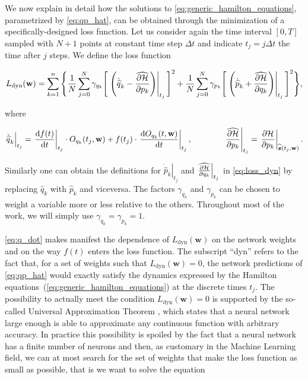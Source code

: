 \documentclass[prd,aps,a4paper,eqsecnum,nofootinbib,floatfix,twocolumn,superscriptaddress]{revtex4-2}
\renewcommand{\quote}[1]{``#1''}
\begin{document}
We now explain in detail how the solutions to \eqref{eq:generic_hamilton_equations}, parametrized by \eqref{eq:qp_hat}, can be obtained through the minimization of a  specifically-designed loss function. Let us consider again the time interval $[0,T]$ sampled with $N+1$ points at constant time step $\Delta t$ and indicate $t_j=j\Delta t$ the time after $j$ steps. We define the loss function
\begin{widetext}

\begin{equation} \label{eq:loss_dyn}
    L_\mathrm{dyn}(\textbf{w}) = \sum_{k=1}^{n} \Bigg\{\dfrac{1}{N} \sum_{j=0}^{N} \gamma_{q_k}\Bigg[\left.\Bigg(\dot{\widehat{q}}_k-\widehat{\pdv{\mathcal{H}}{p_{k}}}\Bigg)\right|_{t_j}\Bigg]^2 +\dfrac{1}{N} \sum_{j=0}^{N}\gamma_{p_k}\Bigg[\left.\Bigg(\dot{\widehat{p}}_k+\widehat{\pdv{\mathcal{H}}{q_k}}\Bigg)\right|_{t_j} \Bigg]^2\Bigg\},
\end{equation}

where

\begin{equation}\label{eq:q_dot}
    \left. \dot{\widehat{q}}_k\right|_{t_j} = \left.\dv{f(t)}{t}\right|_{t_j}\cdot O_{q_k}(t_j,\textbf{w})+f(t_j)\cdot \left.\dv{O_{q_k}(t,\textbf{w})}{t}\right|_{t_j}, \qquad\qquad \left. \widehat{\pdv{\mathcal{H}}{p_k}}\right|_{t_j}=\left.\pdv{\mathcal{H}}{p_k}\right|_{\widehat{\textbf{z}}(t_j,\textbf{w})}.
\end{equation}

\end{widetext}
Similarly one can obtain the definitions for $\left.\dot{\widehat{p}}_k\right|_{t_j}$ and $\left.\widehat{\pdv{\mathcal{H}}{q_k}}\right|_{t_j}$ in \eqref{eq:loss_dyn} by replacing $\widehat{q}_k$ with $\widehat{p}_k$ and viceversa. The factors $\gamma_{q_k}$ and $\gamma_{p_k}$ can be chosen to weight a variable more or less relative to the others. Throughout most of the work, we will simply use $\gamma_{q_k}=\gamma_{p_k}=1$.


\eqref{eq:q_dot} makes manifest the dependence of $L_\mathrm{dyn}(\textbf{w})$ on the network weights and on the way $f(t)$ enters the loss function. The subscript \quote{dyn} refers to the fact that,  for a set of weights such that $L_\mathrm{dyn}(\textbf{w})=0$, the network predictions of \eqref{eq:qp_hat} would exactly satisfy the dynamics expressed by the Hamilton equations~(\ref{eq:generic_hamilton_equations}) at the discrete times $t_j$.  The possibility to actually meet the condition  $L_\mathrm{dyn}(\textbf{w})=0$ is supported by the so-called Universal Approximation Theorem \cite{hornik1989multilayer,Goodfellow-et-al-2016}, which states that a neural network large enough is able to approximate any continuous function with arbitrary accuracy. In practice this possibility is spoiled by the fact that a neural network has a finite number of neurons and then, as customary in the Machine Learning field, we can at most search for the set of weights that make the loss function as small as possible, that is we want to solve the equation
\end{document}

